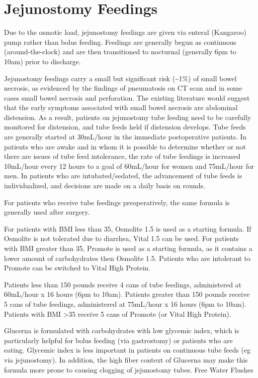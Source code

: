 \documentclass[
]{book}
\begin{document}
\hypertarget{jejunostomy-feedings}{%
\chapter{Jejunostomy Feedings}\label{jejunostomy-feedings}}

Due to the osmotic load, jejunostomy feedings are given via enteral (Kangaroo) pump rather than bolus feeding. Feedings are generally begun as continuous (around-the-clock) and are then transitioned to nocturnal (generally 6pm to 10am) prior to discharge.

Jejunostomy feedings carry a small but significant risk (\textasciitilde1\%) of small bowel necrosis, as evidenced by the findings of pneumatosis on CT scan and in some cases small bowel necrosis and perforation. The existing literature would suggest that the early symptoms associated with small bowel necrosis are abdominal distension. As a result, patients on jejunostomy tube feeding need to be carefully monitored for distension, and tube feeds held if distension develops.\citep{taylor34} Tube feeds are generally started at 30mL/hour in the immediate postoperative patients. In patients who are awake and in whom it is possible to determine whether or not there are issues of tube feed intolerance, the rate of tube feedings is increased 10mL/hour every 12 hours to a goal of 60mL/hour for women and 75mL/hour for men. In patients who are intubated/sedated, the advancement of tube feeds is individualized, and decisions are made on a daily basis on rounds.

For patients who receive tube feedings preoperatively, the same formula is generally used after surgery.

For patients with BMI less than 35, Osmolite 1.5 is used as a starting formula. If Osmolite is not tolerated due to diarrhea, Vital 1.5 can be used. For patients with BMI greater than 35, Promote is used as a starting formula, as it contains a lower amount of carbohydrates then Osmolite 1.5. Patients who are intolerant to Promote can be switched to Vital High Protein.

Patients less than 150 pounds receive 4 cans of tube feedings, administered at 60mL/hour x 16 hours (6pm to 10am). Patients greater than 150 pounds receive 5 cans of tube feedings, administered at 75mL/hour x 16 hours (6pm to 10am). Patients with BMI \textgreater35 receive 5 cans of Promote (or Vital High Protein).

Glucerna is formulated with carbohydrates with low glycemic index, which is particularly helpful for bolus feeding (via gastrostomy) or patients who are eating. Glycemic index is less important in patients on continuous tube feeds (eg via jejunostomy). In addition, the high fiber context of Glucerna may make this formula more prone to causing clogging of jejunostomy tubes.
Free Water Flushes
\end{document}
